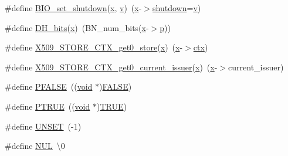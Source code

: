 \begin{DoxyCompactItemize}
\item 
\#define \hyperlink{group__MOD__SSL__PRIVATE_gac7457b2fc0c4a4c0a1c23c2069eb23d8}{B\+I\+O\+\_\+set\+\_\+shutdown}(\hyperlink{pcregrep_8txt_a4242e9148f20c002763bf4ba53b26ad6}{x},  \hyperlink{pcregrep_8txt_aeed5af99df1c3051bb73049f9d549819}{v})~(\hyperlink{pcregrep_8txt_a4242e9148f20c002763bf4ba53b26ad6}{x}-\/$>$\hyperlink{apr__arch__os2calls_8h_abb5abf491305ecb624576b9d3120e0ae}{shutdown}=\hyperlink{pcregrep_8txt_aeed5af99df1c3051bb73049f9d549819}{v})
\item 
\#define \hyperlink{group__MOD__SSL__PRIVATE_gaac033f4f424d69e0858bc32b868b7566}{D\+H\+\_\+bits}(\hyperlink{pcregrep_8txt_a4242e9148f20c002763bf4ba53b26ad6}{x})~(B\+N\+\_\+num\+\_\+bits(\hyperlink{pcregrep_8txt_a4242e9148f20c002763bf4ba53b26ad6}{x}-\/$>$\hyperlink{group__APACHE__CORE__MPM_ga5cd91701e5c167f2b1a38e70ab57817e}{p}))
\item 
\#define \hyperlink{group__MOD__SSL__PRIVATE_gaa2e5cb725889794af5b385fc51ea97e5}{X509\+\_\+\+S\+T\+O\+R\+E\+\_\+\+C\+T\+X\+\_\+get0\+\_\+store}(\hyperlink{pcregrep_8txt_a4242e9148f20c002763bf4ba53b26ad6}{x})~(\hyperlink{pcregrep_8txt_a4242e9148f20c002763bf4ba53b26ad6}{x}-\/$>$\hyperlink{group__APR__Util__Bucket__Brigades_ga0525238c5b09cb4ac5067ddec654d09c}{ctx})
\item 
\#define \hyperlink{group__MOD__SSL__PRIVATE_gab3b31f132257dbddb2973cd38fd5aea9}{X509\+\_\+\+S\+T\+O\+R\+E\+\_\+\+C\+T\+X\+\_\+get0\+\_\+current\+\_\+issuer}(\hyperlink{pcregrep_8txt_a4242e9148f20c002763bf4ba53b26ad6}{x})~(\hyperlink{pcregrep_8txt_a4242e9148f20c002763bf4ba53b26ad6}{x}-\/$>$current\+\_\+issuer)
\item 
\#define \hyperlink{group__MOD__SSL__PRIVATE_ga35d151d61ce104f63ec203276146981b}{P\+F\+A\+L\+SE}~((\hyperlink{group__MOD__ISAPI_gacd6cdbf73df3d9eed42fa493d9b621a6}{void} $\ast$)\hyperlink{pcregrep_8c_aa93f0eb578d23995850d61f7d61c55c1}{F\+A\+L\+SE})
\item 
\#define \hyperlink{group__MOD__SSL__PRIVATE_ga11e47a1a9c6da27c643d45687565fe55}{P\+T\+R\+UE}~((\hyperlink{group__MOD__ISAPI_gacd6cdbf73df3d9eed42fa493d9b621a6}{void} $\ast$)\hyperlink{pcregrep_8c_aa8cecfc5c5c054d2875c03e77b7be15d}{T\+R\+UE})
\item 
\#define \hyperlink{group__MOD__SSL__PRIVATE_gab0b265b69299aeccfade9365cf04db2a}{U\+N\+S\+ET}~(-\/1)
\item 
\#define \hyperlink{group__MOD__SSL__PRIVATE_gaf19d48b9f61047a668649a2f9dc317ff}{N\+UL}~\textquotesingle{}\textbackslash{}0\textquotesingle{}
\item 

\end{DoxyCompactItemize}
